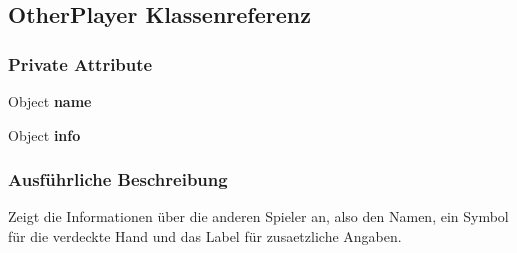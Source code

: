 \hypertarget{a00018}{\subsection{Other\-Player Klassenreferenz}
\label{a00018}
}
\subsubsection*{Private Attribute}
\begin{DoxyCompactItemize}
\item 
\hypertarget{a00018_a46ff4804e1f3b2aa954327b7ebaedb5f}{Object {\bfseries name}}\label{a00018_a46ff4804e1f3b2aa954327b7ebaedb5f}

\item 
\hypertarget{a00018_a479739d676f2040870ad5be69a6c8a9e}{Object {\bfseries info}}\label{a00018_a479739d676f2040870ad5be69a6c8a9e}

\end{DoxyCompactItemize}


\subsubsection{Ausführliche Beschreibung}
Zeigt die Informationen über die anderen Spieler an, also den Namen, ein Symbol für die verdeckte Hand und das Label für zusaetzliche Angaben. 